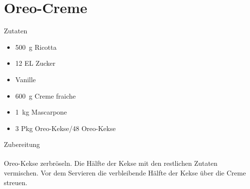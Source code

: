 \section*{Oreo-Creme}
\ihead{}\ohead{}
\cfoot{}
{\Large Zutaten}
\begin{multicols}{2}
\begin{itemize}
    \item \SI{500}{g} Ricotta
    \item \num{12} EL Zucker
    \item Vanille
    \item \SI{600}{g} Creme fraiche
    \item \SI{1}{kg} Mascarpone
    \item \num{3} Pkg Oreo-Kekse/\num{48} Oreo-Kekse
\end{itemize}
\end{multicols}
\noindent
{\Large Zubereitung}\\
\\
Oreo-Kekse zerbröseln.
Die Hälfte der Kekse mit den restlichen Zutaten vermischen.
Vor dem Servieren die verbleibende Hälfte der Kekse über die Creme streuen.